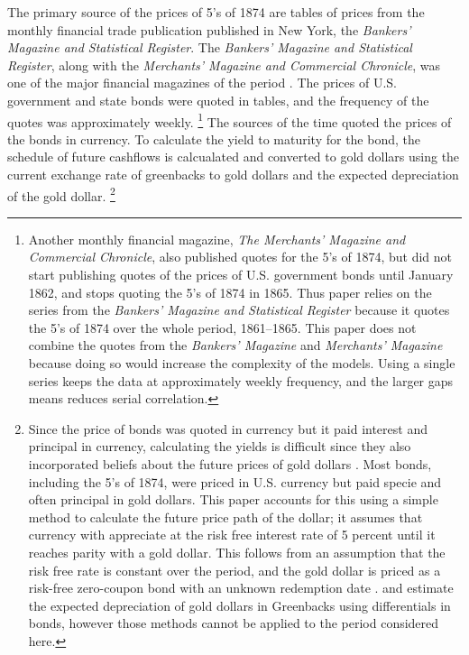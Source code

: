The primary source of the prices of 5's of 1874 are tables of prices from the monthly financial trade publication published in New York, the \textit{Bankers' Magazine and Statistical Register}.
The \textit{Bankers' Magazine and Statistical Register}, along with the \textit{Merchants' Magazine and Commercial Chronicle}, was one of the major financial magazines of the period \parencites[186]{Mitchell1903}.
The prices of U.S. government and state bonds were quoted in tables, and the frequency of the quotes was approximately weekly.%
\footnote{
  Another monthly financial magazine, \textit{The Merchants' Magazine and Commercial Chronicle}, also published quotes for the 5's of 1874, but did not start publishing quotes of the prices of U.S. government bonds until January 1862, and stops quoting the 5's of 1874 in 1865.
  Thus paper relies on the series from the \textit{Bankers' Magazine and Statistical Register} because it quotes the 5's of 1874 over the whole period, 1861--1865.%
  This paper does not combine the quotes from the \textit{Bankers' Magazine} and \textit{Merchants' Magazine} because doing so would increase the complexity of the models. Using a single series keeps the data at approximately weekly frequency, and the larger gaps means reduces serial correlation.
}
The sources of the time quoted the prices of the bonds in currency.
To calculate the yield to maturity for the bond, the schedule of future cashflows is calcualated and converted to gold dollars using the current exchange rate of greenbacks to gold dollars and the expected depreciation of the gold dollar.%
\footnote{
  Since the price of bonds was quoted in currency but it paid interest and principal in currency, calculating the yields is difficult since they also incorporated beliefs about the future prices of gold dollars \parencites[Appendix A]{Macaulay1938}{Roll1972}{Calomiris1988}[302-303]{HomerSylla2005}.
  Most bonds, including the 5's of 1874, were priced in U.S. currency but paid specie and often principal in gold dollars.
  This paper accounts for this using a simple method to calculate the future price path of the dollar; it assumes that currency with appreciate at the risk free interest rate of 5 percent until it reaches parity with a gold dollar.
  This follows from an assumption that the risk free rate is constant over the period, and the gold dollar is priced as a risk-free zero-coupon bond with an unknown redemption date \cite{McCandless1996}.
  \textcite{Roll1972} and \textcite{Calomiris1988} estimate the expected depreciation of gold dollars in Greenbacks using differentials in bonds, however those methods cannot be applied to the period considered here.
}

